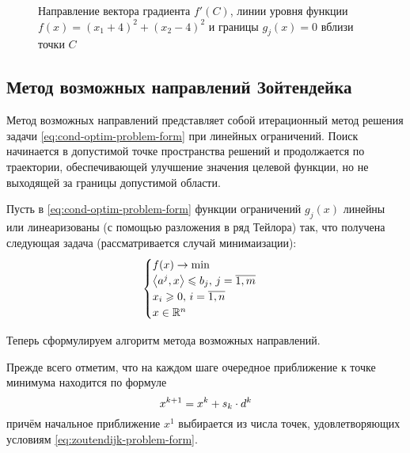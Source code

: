 \begin{itemize}
\begin{figure}[!h]
    \caption{Направление вектора градиента $f'(C)$, линии уровня
      функции $f(x) = (x_1+4)^2+(x_2-4)^2$ и границы $g_j(x)=0$ вблизи
      точки $C$}
    \label{fig:cond-optim-zoom}
  \end{figure}
\end{itemize}

\clearpage
\subsection{Метод возможных направлений Зойтендейка}
\label{sec:zoutendijk}

Метод возможных направлений представляет собой итерационный метод
решения задачи \eqref{eq:cond-optim-problem-form} при линейных
ограничений. Поиск начинается в допустимой точке пространства решений
и продолжается по траектории, обеспечивающей улучшение значения
целевой функции, но не выходящей за границы допустимой области.

Пусть в \eqref{eq:cond-optim-problem-form} функции ограничений
$g_j(x)$ линейны или линеаризованы (с помощью разложения в ряд
Тейлора) так, что получена следующая задача (рассматривается случай
минимаизации):
\begin{equation}
  \label{eq:zoutendijk-problem-form}
  \begin{cases}
    f(x) \to \min \\
    {\left \langle a^j,x \right \rangle} \leqslant b_j,\, j=\overline{1,m} \\
    x_i \geqslant 0,\, i=\overline{1,n} \\
    x \in \mathbb{R}^n
  \end{cases}
\end{equation}

Теперь сформулируем алгоритм метода возможных направлений.

Прежде всего отметим, что на каждом шаге очередное приближение к точке
минимума находится по формуле
\begin{equation}
  \label{eq:zoutendijk-iter}
  x^{k+1} = x^k + s_k \cdot d^k
\end{equation}
причём начальное приближение $x^1$ выбирается из числа точек,
удовлетворяющих условиям \eqref{eq:zoutendijk-problem-form}.

